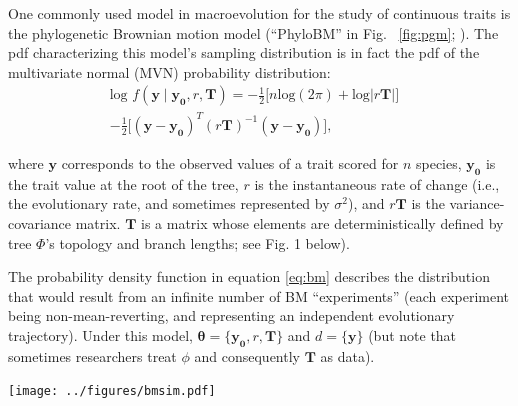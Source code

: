 \documentclass[oneside]{article}
\begin{document}
\begin{tcolorbox}[breakable, width=\textwidth, colback=gray!10, boxrule=0pt,
  title=Box 1: Models characterized by well-known parametric distributions, fonttitle=\bfseries]
  \small 
  One commonly used model in macroevolution for the study of continuous traits is the phylogenetic Brownian motion model (``PhyloBM'' in Fig. ~\ref{fig:pgm}; \citealt{felsenstein73}).
The pdf characterizing this model's sampling distribution is in fact the pdf of the multivariate normal (MVN) probability distribution:
\begin{equation}
  \begin{split}
    \text{log }f(\boldsymbol{y} \mid \boldsymbol{y_0}, r, \boldsymbol{T}) = -\frac{1}{2} \Big[ n\text{log}(2\pi) + \text{log}|r \boldsymbol{T}| \Big] & \\
    -\frac{1}{2} \Big[ (\mathbf{y} - \boldsymbol{y_0})^T (r \boldsymbol{T})^{-1} (\mathbf{y} - \boldsymbol{y_0}) \Big],
  \label{eq:bm}
  \end{split}
\end{equation}

\noindent where $\boldsymbol{y}$ corresponds to the observed values of a trait scored for $n$ species, $\boldsymbol{y_0}$ is the trait value at the root of the tree, $r$ is the instantaneous rate of change (i.e., the evolutionary rate, and sometimes represented by $\sigma^2$), and $r\boldsymbol{T}$ is the variance-covariance matrix.
$\boldsymbol{T}$ is a matrix whose elements are deterministically defined by tree $\Phi$'s topology and branch lengths; see Fig. 1 below).

\vspace{.25cm}
The probability density function in equation \eqref{eq:bm} describes the distribution
that would result from an infinite number of BM ``experiments'' (each experiment
being non-mean-reverting, and representing an independent evolutionary trajectory).
Under this model, $\boldsymbol{\theta} = \{\boldsymbol{y_0}, r, \boldsymbol{T}\}$ and
$d = \{\boldsymbol{y}\}$ (but note that sometimes researchers treat $\phi$ and
consequently $\boldsymbol{T}$ as
data).

\begin{center}
\texttt{[image: ../figures/bmsim.pdf]}
\label{fig:bmsim}
\end{center}


\end{tcolorbox}
\end{document}
